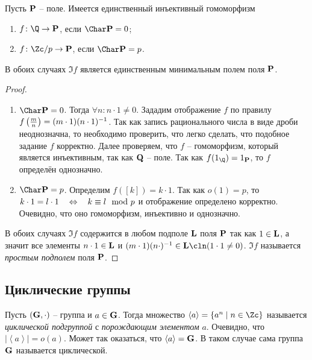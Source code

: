 \begin{theorem}
  Пусть $\mathbf{P}$ -- поле. Имеется единственный инъективный гомоморфизм
    \begin{enumerate}
      \item $f\colon\Q\to\Pb$, если $\Char\Pb=0$;
      \item $f\colon \Zc/p\to\Pb$, если $\Char\Pb=p$.
    \end{enumerate}
  В обоих случаях $\Im f$ является единственным минимальным полем поля $\mathbf{P}$.
\end{theorem}
\begin{proof}
  \begin{enumerate}
    \item $\Char\Pb=0$. Тогда $\forall n\colon n\cdot1\ne0$. Зададим
      отображение $f$ по правилу
      $f\left(\frac{m}n\right)\bw=(m\cdot1)(n\cdot 1)^{-1}$. Так как
      запись рационального числа в виде дроби неоднозначна, то
      необходимо проверить, что легко сделать, что подобное задание
      $f$ корректно. Далее проверяем, что $f$ -- гомоморфизм, который
      является инъективным, так как $\mathbf{Q}$ -- поле. Так как
      $f(1_\Q)=1_{\Pb}$, то $f$ определён однозначно.
    \item $\Char\Pb=p$. Определим $f([k])=k\cdot1$. Так как $o(1)=p$, то $k\cdot1=l\cdot1\mathbin{\quad\Leftrightarrow\quad} k\equiv l\mod p$ и отображение определено корректно. Очевидно, что оно гомоморфизм, инъективно и однозначно.
  \end{enumerate}

  В обоих случаях $\Im f$ содержится в любом подполе $\mathbf{L}$ поля $\mathbf{P}$ так как $1\in\mathbf{L}$, а значит все элементы $n\cdot1\in\mathbf{L}$ и $(m\cdot1)(n\cdot)^{-1}\in\Lb\cln(1\cdot1\ne0)$. $\Im f$ называется \emph{простым подполем} поля $\mathbf{P}$.
\end{proof}
\subsection{Циклические группы}

\begin{df}
Пусть $(\mathbf{G},\cdot)$ -- группа и $a\in\mathbf{G}$. Тогда множество $\left\langle a\right\rangle=\{a^n\mid n\in\Zc\}$ называется \emph{циклической подгруппой} с \emph{порождающим элементом} $a$. Очевидно, что $|\left\langle a\right\rangle|=o(a)$. Может так оказаться, что $\left\langle a\right\rangle = \mathbf{G}$. В таком случае сама группа $\mathbf{G}$ называется циклической.
\end{df}

